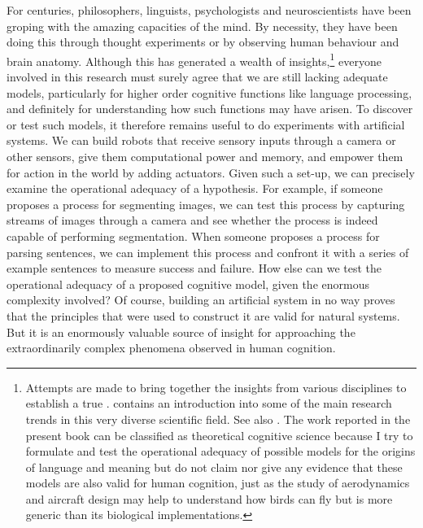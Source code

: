 For centuries, philosophers, linguists, psychologists and 
neuroscientists have been groping with the amazing capacities
of the mind. By necessity, they have been doing this through
thought experiments or by observing human behaviour and
brain anatomy. Although this has generated a wealth
of insights,\footnote{Attempts are made to bring together the insights from various
disciplines to establish a true . 
\cite{Osherton:1995} contains an introduction into some of the main 
research trends in this very diverse scientific field. 
See also \cite{Luger:1994}. The work reported in the present book can be 
classified as theoretical
cognitive science because I try to formulate and test
the operational adequacy of possible models for the 
origins of language and meaning but do not claim nor
give any evidence that these models are also valid for
human cognition, just as the study of aerodynamics and 
aircraft design may help to understand how birds can 
fly but is more generic than its biological 
implementations.}
everyone involved in this research must surely 
agree that we are still lacking adequate models, 
particularly for higher order cognitive functions like language
processing, and definitely for understanding how such 
functions may have arisen. 
To discover or test such models, it therefore
remains useful to do experiments with artificial systems.
We can build robots that receive sensory inputs
through a camera or other sensors, give them computational 
power and memory, and empower them 
for action in the world by adding actuators. Given such a 
set-up, we can precisely examine the operational adequacy 
of a hypothesis. For example, if someone proposes
a process for segmenting images, we can test this process 
by capturing streams of images through a camera and 
see whether the process is indeed capable of performing 
segmentation. When someone proposes a process 
for parsing sentences, we 
can implement this process and confront it with a series of 
example sentences to measure success and failure. 
How else can we test the operational adequacy of a proposed
cognitive model, given the enormous complexity involved? 
Of course, building an artificial system in no way proves
that the principles that were used to construct it are valid
for natural systems. But it is an enormously valuable 
source of insight for approaching the extraordinarily 
complex phenomena observed in human cognition. 


